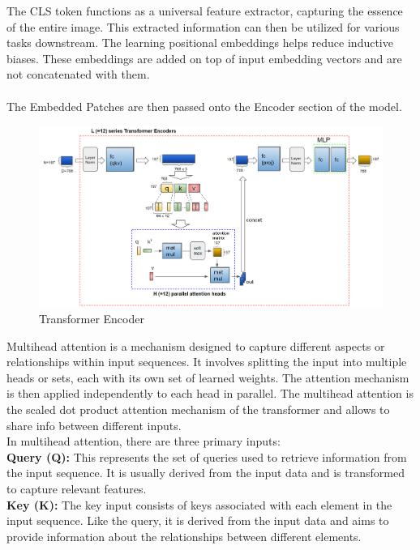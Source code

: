 The CLS token functions as a universal feature extractor, capturing the essence of the entire image. This extracted information can then be utilized for various tasks downstream. The learning positional embeddings helps reduce inductive biases. These embeddings are added on top of input embedding vectors and are not concatenated with them.\\
\\
The Embedded Patches are then passed onto the Encoder section of the model.\\
\begin{figure}[htbp]
    \centering
    \includegraphics[width=6.3in]{img/transformer_encoder.png}
    \caption{{Transformer Encoder}}
\end{figure}

Multihead attention is a mechanism designed to capture different aspects or relationships within input sequences. It involves splitting the input into multiple heads or sets, each with its own set of learned weights. The attention mechanism is then applied independently to each head in parallel.
The multihead attention is the scaled dot product attention mechanism of the transformer and allows to share info between different inputs.\\

In multihead attention, there are three primary inputs:\\

\textbf{Query (Q):} This represents the set of queries used to retrieve information from the input sequence. It is usually derived from the input data and is transformed to capture relevant features.\\

\textbf{Key (K):} The key input consists of keys associated with each element in the input sequence. Like the query, it is derived from the input data and aims to provide information about the relationships between different elements.\\

